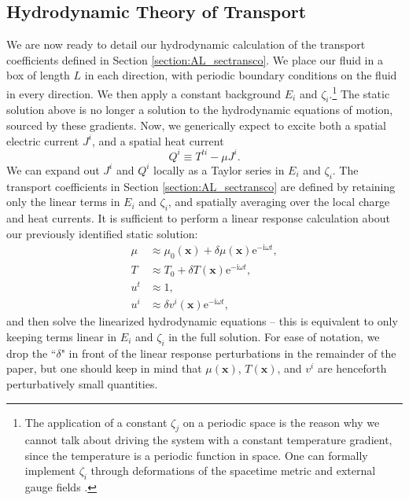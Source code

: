 \subsection{Hydrodynamic Theory of Transport}
We are now ready to detail our hydrodynamic calculation of the transport coefficients defined in Section \ref{section:AL_sectransco}.   We place our fluid in a box of length $L$ in each direction, with periodic boundary conditions on the fluid in every direction.   We then apply a constant background  $E_i$ and $\zeta_i$.\footnote{The application of a constant $\zeta_j$ on a periodic space is the reason why we cannot talk about driving the system with a constant temperature gradient, since the temperature is a periodic function in space.  One can formally implement $\zeta_i$ through deformations of the spacetime metric and external gauge fields \cite{hartnoll_lectures_2009}.}  The static solution above is no longer a solution to the hydrodynamic equations of motion, sourced by these gradients.   Now, we generically expect to excite both a spatial electric current $J^i$, and a spatial heat current \begin{equation}\label{eq:AL_heatdef}
Q^i \equiv T^{ti} - \mu J^i.
\end{equation}
We can expand out $J^i$ and $Q^i$ locally as a Taylor series in $E_i$ and $\zeta_i$.   The transport coefficients in Section \ref{section:AL_sectransco} are defined by retaining only the linear terms in $E_i$ and $\zeta_i$, and spatially averaging over the local charge and heat currents.   It is  sufficient to perform a linear response calculation about our previously identified static solution:
\begin{subequations}\begin{align}
\mu &\approx \mu_0(\mathbf{x}) + \delta \mu(\mathbf{x}) \mathrm{e}^{-\mathrm{i}\omega t},  \\
T &\approx T_0 + \delta T(\mathbf{x}) \mathrm{e}^{-\mathrm{i}\omega t}, \\
u^t &\approx 1, \\
u^i &\approx \delta v^i (\mathbf{x}) \mathrm{e}^{-\mathrm{i}\omega t},
\end{align}\end{subequations}
and then solve the linearized hydrodynamic equations -- this is equivalent to only keeping terms linear in $E_i$ and $\zeta_i$ in the full solution.   For ease of notation, we drop the ``$\delta$" in  front of the linear response perturbations in the remainder of the paper, but one should keep in mind that $\mu(\mathbf{x})$, $T(\mathbf{x})$, and $v^i$ are henceforth perturbatively small quantities.

